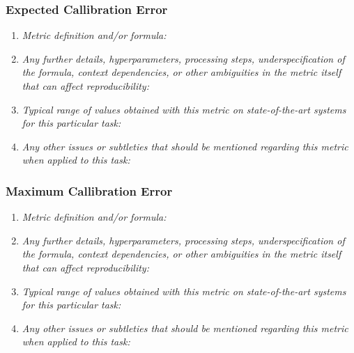 \documentclass[a4paper,11pt]{article}
\begin{document}
        \subsubsection{Expected Callibration Error}
            \begin{enumerate}[label=\alph*.]
                \item \textit{Metric definition and/or formula:}
                \bigskip
                \item \textit{Any further details, hyperparameters, processing steps, underspecification of the formula, context dependencies, or other ambiguities in the metric itself that can affect reproducibility:}
                \bigskip
                \item \textit{Typical range of values obtained with this metric on state-of-the-art systems for this particular task:}
                \bigskip
                \item \textit{Any other issues or subtleties that should be mentioned regarding this metric when applied to this task:}
                \bigskip
            \end{enumerate}
        \subsubsection{Maximum Callibration Error}
            \begin{enumerate}[label=\alph*.]
                \item \textit{Metric definition and/or formula:}
                \bigskip
                \item \textit{Any further details, hyperparameters, processing steps, underspecification of the formula, context dependencies, or other ambiguities in the metric itself that can affect reproducibility:}
                \bigskip
                \item \textit{Typical range of values obtained with this metric on state-of-the-art systems for this particular task:}
                \bigskip
                \item \textit{Any other issues or subtleties that should be mentioned regarding this metric when applied to this task:}
                \bigskip
            \end{enumerate}
\end{document}
